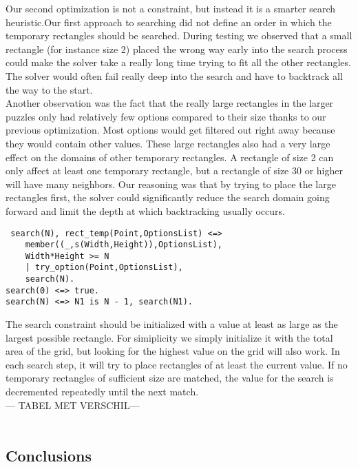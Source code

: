 Our second optimization is not a constraint, but instead it is a smarter search heuristic.Our first approach to searching did not define an order in which the temporary rectangles should be searched. During testing we observed that a small rectangle (for instance size 2) placed the wrong way early into the search process could make the solver take a really long time trying to fit all the other rectangles. The solver would often fail really deep into the search and have to backtrack all the way to the start. \\
 Another observation was the fact that the really large rectangles in the larger puzzles only had relatively few options compared to their size thanks to our previous optimization. Most options would get filtered out right away because they would contain other values. These large rectangles also had a very large effect on the domains of other temporary rectangles. A rectangle of size 2 can only affect at least one temporary rectangle, but a rectangle of size 30 or higher will have many neighbors. Our reasoning was that by trying to place the large rectangles first, the solver could significantly reduce the search domain going forward and limit the depth at which backtracking usually occurs.
 \begin{lstlisting}
 search(N), rect_temp(Point,OptionsList) <=>
	member((_,s(Width,Height)),OptionsList),
	Width*Height >= N
	| try_option(Point,OptionsList),
	search(N).
search(0) <=> true.
search(N) <=> N1 is N - 1, search(N1).
\end{lstlisting}
The search constraint should be initialized with a value at least as large as the largest possible rectangle. For simiplicity we simply initialize it with the total area of the grid, but looking for the highest value on the grid will also work. In each search step, it will try to place rectangles of at least the current value. If no temporary rectangles of sufficient size are matched, the value for the search is decremented repeatedly until the next match. \\

--- TABEL MET VERSCHIL--- \\ \\
\subsection{Conclusions}


